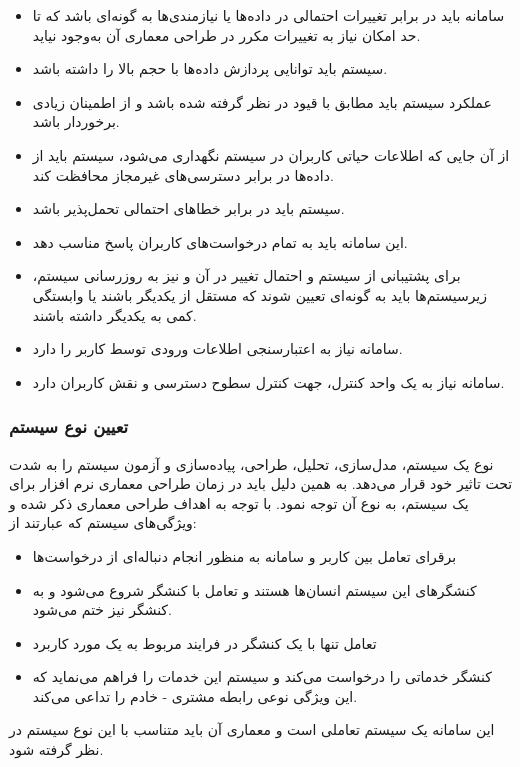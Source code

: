 \documentclass[12pt]{article}
\begin{document}
	\begin{itemize}
		\item
		سامانه باید در برابر تغییرات احتمالی در داده‌ها یا نیازمندی‌ها به گونه‌ای باشد که تا حد امکان نیاز به تغییرات مکرر در طراحی معماری آن به‌وجود نیاید.
		\item
سیستم باید توانایی پردازش داده‌ها با حجم بالا را داشته باشد.
		\item
		عملکرد سیستم باید مطابق با قیود در نظر گرفته شده باشد و از اطمینان زیادی برخوردار باشد.
		\item
		از آن جایی که اطلاعات حیاتی کاربران در سیستم نگهداری می‌شود، سیستم باید از داده‌ها در برابر دسترسی‌های غیرمجاز محافظت کند.
		\item
سیستم باید در برابر خطاهای احتمالی تحمل‌پذیر باشد.
		\item
این سامانه باید به تمام درخواست‌های کاربران پاسخ مناسب دهد.
		\item
		برای پشتیبانی از سیستم و احتمال تغییر در آن و نیز به روزرسانی سیستم، زیرسیستم‌ها باید به گونه‌ای تعیین شوند که مستقل از یکدیگر باشند یا وابستگی کمی به یکدیگر داشته باشند.
		\item
		سامانه نیاز به اعتبارسنجی اطلاعات ورودی توسط کاربر را دارد.
		\item
		سامانه نیاز به یک واحد کنترل، جهت کنترل سطوح دسترسی و نقش کاربران دارد.
	\end{itemize}

	\subsubsection{تعیین نوع سیستم}
	نوع یک سیستم، مدل‌سازی، تحلیل، طراحی، پیاده‌سازی و آزمون سیستم را به شدت تحت تاثیر خود قرار می‌دهد. به همین دلیل باید در زمان طراحی معماری نرم افزار برای یک سیستم، به نوع آن توجه نمود.
	با توجه به اهداف طراحی معماری ذکر شده و ویژگی‌های سیستم که عبارتند از:

	\begin{itemize}
		\item برقرای تعامل بین کاربر و سامانه به منظور انجام دنباله‌ای از درخواست‌ها
		\item کنشگرهای این سیستم انسان‌ها هستند و تعامل با کنشگر شروع می‌شود و به کنشگر نیز ختم می‌شود.
		\item تعامل تنها با یک کنشگر در فرایند مربوط به یک مورد کاربرد
		\item کنشگر خدماتی را درخواست می‌کند و سیستم این خدمات را فراهم می‌نماید که این ویژگی نوعی رابطه مشتری - خادم را تداعی می‌کند.
	\end{itemize}
	این سامانه یک سیستم تعاملی است و معماری آن باید متناسب با این نوع سیستم در نظر گرفته شود.
\end{document}
